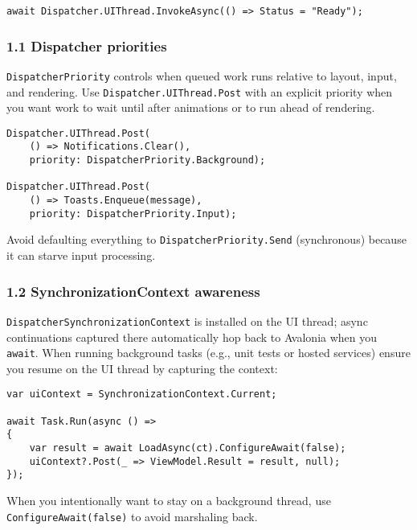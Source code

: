 \begin{lstlisting}
await Dispatcher.UIThread.InvokeAsync(() => Status = "Ready");
\end{lstlisting}

\subsubsection{1.1 Dispatcher priorities}\label{dispatcher-priorities}

\passthrough{\lstinline!DispatcherPriority!} controls when queued work
runs relative to layout, input, and rendering. Use
\passthrough{\lstinline!Dispatcher.UIThread.Post!} with an explicit
priority when you want work to wait until after animations or to run
ahead of rendering.

\begin{lstlisting}
Dispatcher.UIThread.Post(
    () => Notifications.Clear(),
    priority: DispatcherPriority.Background);

Dispatcher.UIThread.Post(
    () => Toasts.Enqueue(message),
    priority: DispatcherPriority.Input);
\end{lstlisting}

Avoid defaulting everything to
\passthrough{\lstinline!DispatcherPriority.Send!} (synchronous) because
it can starve input processing.

\subsubsection{1.2 SynchronizationContext
awareness}\label{synchronizationcontext-awareness}

\passthrough{\lstinline!DispatcherSynchronizationContext!} is installed
on the UI thread; async continuations captured there automatically hop
back to Avalonia when you \passthrough{\lstinline!await!}. When running
background tasks (e.g., unit tests or hosted services) ensure you resume
on the UI thread by capturing the context:

\begin{lstlisting}
var uiContext = SynchronizationContext.Current;

await Task.Run(async () =>
{
    var result = await LoadAsync(ct).ConfigureAwait(false);
    uiContext?.Post(_ => ViewModel.Result = result, null);
});
\end{lstlisting}

When you intentionally want to stay on a background thread, use
\passthrough{\lstinline!ConfigureAwait(false)!} to avoid marshaling
back.

